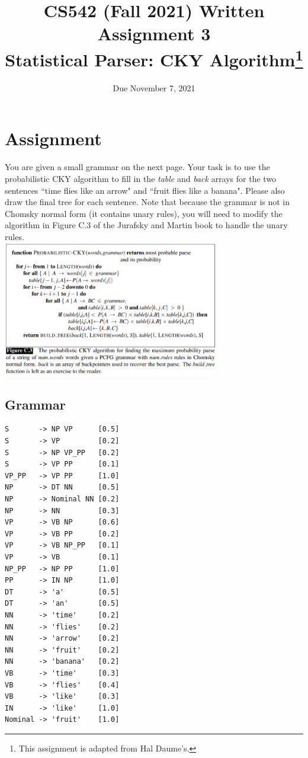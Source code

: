 \documentclass[11pt,letterpaper]{article}
\begin{document}
\title{CS542 (Fall 2021) Written Assignment 3 \\ Statistical Parser: CKY Algorithm\footnote{This assignment is adapted from Hal Daume's.}}
\author{Due November 7, 2021}
\date{}
\maketitle

\section*{Assignment}

You are given a small grammar on the next page. Your task is to use the probabilistic CKY algorithm to fill in the \textit{table} and \textit{back} arrays for the two sentences ``time flies like an arrow" and ``fruit flies like a banana". Please also draw the final tree for each sentence. Note that because the grammar is not in Chomsky normal form (it contains unary rules), you will need to modify the algorithm in Figure C.3 of the Jurafsky and Martin book to handle the unary rules.\\

\noindent\includegraphics[width=358px]{figure_c_3.png}

\subsection*{Grammar}

\begin{verbatim}
S       -> NP VP      [0.5]
S       -> VP         [0.2]
S       -> NP VP_PP   [0.2]
S       -> VP PP      [0.1]
VP_PP   -> VP PP      [1.0]
NP      -> DT NN      [0.5]
NP      -> Nominal NN [0.2]
NP      -> NN         [0.3]
VP      -> VB NP      [0.6]
VP      -> VB PP      [0.2]
VP      -> VB NP_PP   [0.1]
VP      -> VB         [0.1]
NP_PP   -> NP PP      [1.0]
PP      -> IN NP      [1.0]
DT      -> 'a'        [0.5]
DT      -> 'an'       [0.5]
NN      -> 'time'     [0.2]
NN      -> 'flies'    [0.2]
NN      -> 'arrow'    [0.2]
NN      -> 'fruit'    [0.2]
NN      -> 'banana'   [0.2]
VB      -> 'time'     [0.3]
VB      -> 'flies'    [0.4]
VB      -> 'like'     [0.3]
IN      -> 'like'     [1.0]
Nominal -> 'fruit'    [1.0]
\end{verbatim}\newpage
\end{document}
